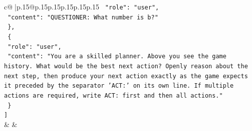 \documentclass{article}
\begin{document}
{\begin{supertabular}{c@{$\;$}|p{.15\linewidth}@{}p{.15\linewidth}p{.15\linewidth}p{.15\linewidth}p{.15\linewidth}p{.15\linewidth}}
{{{\texttt{    "role": "user",} \\
\texttt{    "content": "QUESTIONER: What number is b?"} \\
\texttt{  \},} \\
\texttt{  \{} \\
\texttt{    "role": "user",} \\
\texttt{    "content": "You are a skilled planner. Above you see the game history. What would be the best next action? Openly reason about the next step, then produce your next action exactly as the game expects it preceded by the separator 'ACT:' on its own line. If multiple actions are required, write ACT: first and then all actions."} \\
\texttt{  \}} \\
\texttt{{]}} \\
            }
        }
    }
    & & \\ \\


\end{supertabular}}
\end{document}
